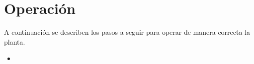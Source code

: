 \section{Operación}
\label{anexo:operacion}

A continuación se describen los pasos a seguir para operar 
de manera correcta la planta.

\begin{itemize}
 \item 
 
\end{itemize}
